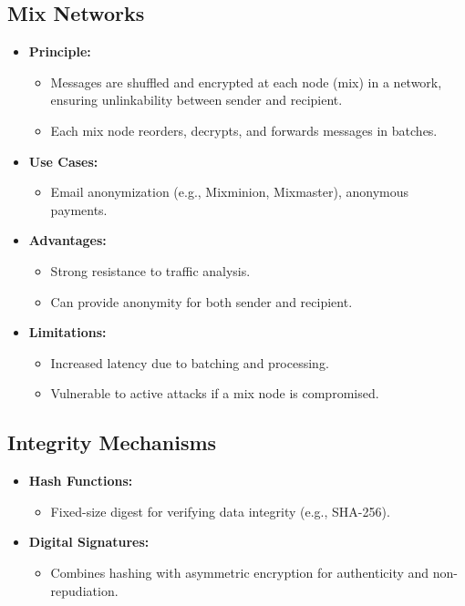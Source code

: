 \documentclass{article}
\begin{document}
\subsection{Mix Networks}
\begin{itemize}
    \item \textbf{Principle:}
    \begin{itemize}
        \item Messages are shuffled and encrypted at each node (mix) in a network, ensuring unlinkability between sender and recipient.
        \item Each mix node reorders, decrypts, and forwards messages in batches.
    \end{itemize}
    \item \textbf{Use Cases:}
    \begin{itemize}
        \item Email anonymization (e.g., Mixminion, Mixmaster), anonymous payments.
    \end{itemize}
    \item \textbf{Advantages:}
    \begin{itemize}
        \item Strong resistance to traffic analysis.
        \item Can provide anonymity for both sender and recipient.
    \end{itemize}
    \item \textbf{Limitations:}
    \begin{itemize}
        \item Increased latency due to batching and processing.
        \item Vulnerable to active attacks if a mix node is compromised.
    \end{itemize}
\end{itemize}

\subsection{Integrity Mechanisms}
\begin{itemize}
    \item \textbf{Hash Functions:}
    \begin{itemize}
        \item Fixed-size digest for verifying data integrity (e.g., SHA-256).
    \end{itemize}
    \item \textbf{Digital Signatures:}
    \begin{itemize}
        \item Combines hashing with asymmetric encryption for authenticity and non-repudiation.
    \end{itemize}
\end{itemize}
\end{document}
